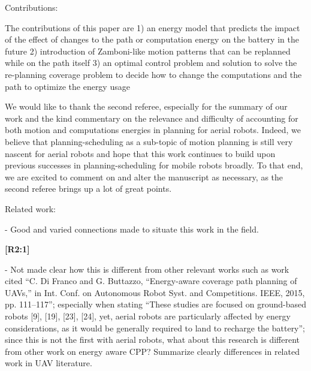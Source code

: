 \documentclass[10pt]{letter}
\begin{document}
Contributions:

The contributions of this paper are 1) an energy model that predicts the impact of the effect of changes to the path or computation energy on the battery in the future 2) introduction of Zamboni-like motion patterns that can be replanned while on the path itself 3) an optimal control problem and solution to solve the re-planning coverage problem to decide how to change the computations and the path to optimize the energy usage

{\color{blue} 


{\hspace*{-4.5em}{[R2]}\vspace*{-1.9em}}

We would like to thank the second referee, especially for the summary of our work and the kind commentary on the relevance and difficulty of accounting for both motion and computations energies in planning for aerial robots. Indeed, we believe that planning-scheduling as a sub-topic of motion planning is still very nascent for aerial robots and hope that this work continues to build upon previous successes in planning-scheduling for mobile robots broadly. To that end, we are excited to comment on and alter the manuscript as necessary, as the second referee brings up a lot of great points.


}

\vspace{2em}

Related work:

- Good and varied connections made to situate this work in the field. 

{\hspace*{-4.5em}\textbf{[R2:1]}\vspace*{-1.9em}}

- Not made clear how this is different from other relevant works such as work cited ``C. Di Franco and G. Buttazzo, ``Energy-aware coverage path planning of UAVs,'' in Int. Conf. on Autonomous Robot Syst. and Competitions. IEEE, 2015, pp. 111–117''; especially when stating ``These studies are focused on ground-based robots [9], [19], [23], [24], yet, aerial robots are particularly affected by energy considerations, as it would be generally required to land to recharge the battery''; since this is not the first with aerial robots, what about this research is different from other work on energy aware CPP? Summarize clearly differences in related work in UAV literature.
\end{document}
